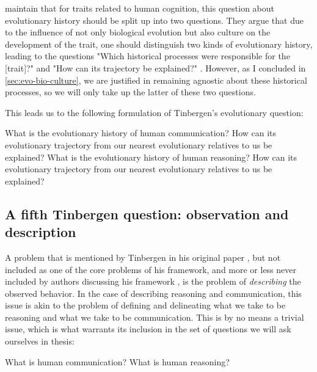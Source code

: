 \citet{BatesonLaland13} maintain that for traits related to human cognition, this question about evolutionary history should be split up into two questions. They argue that due to the influence of not only biological evolution but also culture on the development of the trait, one should distinguish two kinds of evolutionary history, leading to the questions "Which historical processes were responsible for the [trait]?" and "How can its trajectory be explained?" \citep[p.~714]{BatesonLaland13}. However, as I concluded in \cref{sec:evo-bio-culture}, we are justified in remaining agnostic about these historical processes, so we will only take up the latter of these two questions.

This leads us to the following formulation of Tinbergen's evolutionary question:

\begin{exe}
    \ex
    \begin{xlist}
        \ex What is the evolutionary history of human communication? How can its evolutionary trajectory from our nearest evolutionary relatives to us be explained?
        \ex What is the evolutionary history of human reasoning? How can its evolutionary trajectory from our nearest evolutionary relatives to us be explained?
    \end{xlist}
\end{exe}

\subsection{A fifth Tinbergen question: observation and description}
A problem that is mentioned by Tinbergen in his original paper \citeyear{Tinbergen63}, but not included as one of the core problems of his framework, and more or less never included by authors discussing his framework \citep{LB02, Laland13, AllenBekoff95}, is the problem of \emph{describing} the observed behavior.
In the case of describing reasoning and communication, this issue is akin to the problem of defining and delineating what we take to be reasoning and what we take to be communication. This is by no means a trivial issue, which is what warrants its inclusion in the set of questions we will ask ourselves in thesis:

\begin{exe}
    \ex
    \begin{xlist}
        \ex What is human communication?
        \ex What is human reasoning?
    \end{xlist}
\end{exe}

